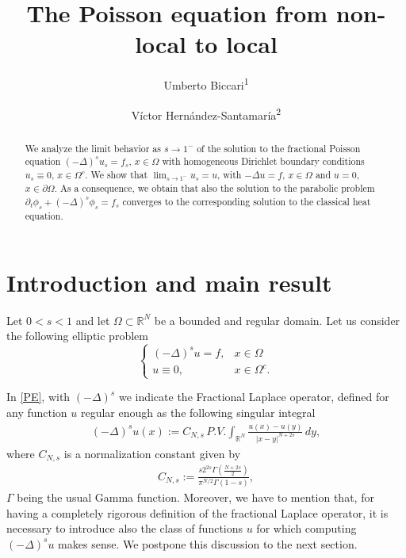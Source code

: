 \documentclass[reqno,twoside]{amsart}
\title{The Poisson equation from non-local to local}
\author{Umberto Biccari\textsuperscript{1}}
\author{V\'ictor Hern\'andez-Santamar\'ia\textsuperscript{2}}
\numberwithin{equation}{section}
\def\RR{{\mathbb{R}}}
\newcommand{\fl}[2]{(-\Delta)^#1#2}
\newcommand{\cns}{C_{N,s}}
\begin{document}


\begin{abstract}
We analyze the limit behavior as $s\to 1^-$ of the solution to the fractional Poisson equation $\fl{s}{u_s}=f_s$, $x\in\Omega$ with homogeneous Dirichlet boundary conditions $u_s\equiv 0$, $x\in\Omega^c$. 
We show that $\lim_{s\to 1^-} u_s =u$, with $-\Delta u =f$, $x\in\Omega$ and $u=0$, $x\in\partial\Omega$. As a consequence, we obtain that also the solution to the parabolic problem $\partial_t\phi_s + \fl{s}{\phi_s} = f_s$ converges to the corresponding solution to the classical heat equation.
\end{abstract}

\maketitle

\section{Introduction and main result}\label{intro}

Let $0<s<1$ and let $\Omega\subset\RR^N$ be a bounded and regular domain. Let us consider the following elliptic problem
\begin{equation}\label{PE}
	\begin{cases}
	\fl{s}{u} = f, &x\in\Omega\tag{$\mathcal P_s$}
	\\
	u\equiv 0, & x\in\Omega^c.
	\end{cases}
\end{equation}

In \eqref{PE}, with $\fl{s}{}$ we indicate the Fractional Laplace operator, defined for any function $u$ regular enough as the following singular integral
\begin{align}\label{frac_lapl}
	\fl{s}{u}(x):=\cns\,P.V.\int_{\RR^N} \frac{u(x)-u(y)}{|x-y|^{N+2s}}\,dy,
\end{align}
where $\cns$ is a normalization constant given by
\begin{align}\label{cns}
	\cns:= \frac{s2^{2s}\Gamma\left(\frac{N+2s}{2}\right)}{\pi^{N/2}\Gamma(1-s)},
\end{align}
$\Gamma$ being the usual Gamma function. Moreover, we have to mention that, for having a completely rigorous definition of the fractional Laplace operator, it is necessary to introduce also the class of functions $u$ for which computing $\fl{s}{u}$ makes sense. We postpone this discussion to the next section.
\end{document}

